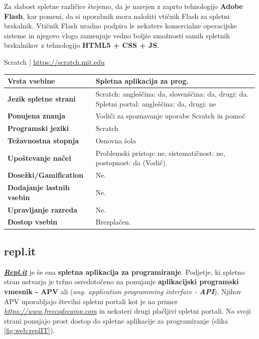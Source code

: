 Za slabost spletne različice štejemo, da je narejen z zaprto
tehnologijo \textbf{Adobe Flash}, kar pomeni, da si uporabnik mora
naložiti vtičnik Flash za spletni brskalnik. Vtičnik Flash uradno
podpira le nekatere komercialne operacijske sisteme in njegovo vlogo
zamenjuje vedno boljše zmožnosti samih spletnih brskalnikov z
tehnologijo \textbf{HTML5 + CSS + JS}.

\begin{osebnabox}[label={osebna:scratch}]{Scratch | \url{https://scratch.mit.edu}}
    \begin{tabular}{
  p{} |
  p{}  }
  \textbf{Vrsta vsebine} & Spletna aplikacija za prog. \\
      \hline
  \textbf{Jezik spletne strani} & Scratch: angleščina: da, slovenščina: da,
                                  drugi: da. Spletni portal:
                                  angleščina: da, drugi: ne\\
      \hline
  \textbf{Ponujena znanja} & Vodiči za spoznavanje uporabe Scratch in pomoč \\
      \hline
 \textbf{Programski jeziki} & Scratch \\
      \hline
  \textbf{Težavnostna stopnja} & Osnovna šola \\
      \hline
   \textbf{Upoštevanje načel} & Problemski pristop: ne,
                                sistematičnost: ne, postopnost: da (Vodič). \\
      \hline
  \textbf{Dosežki/Gamification} & Ne. \\
      \hline
  \textbf{Dodajanje lastnih vsebin} & Ne. \\
      \hline
  \textbf{Upravljanje razreda} & Ne. \\
      \hline
  \textbf{Dostop vsebin} & Brezplačen. \\

\end{tabular}
\end{osebnabox}

\subsection{repl.it}
\label{sec:repl.it}

\textbf{\emph{\href{https://repl.it/}{Repl.it}}} \cite{web:replIT} je še ena
\textbf{spletna aplikacija za programiranje}. Podjetje, ki spletno
stran ustvarja je tržno osredotočeno na ponujanje \textbf{aplikacijski
  programski vmesnik - APV} ali (\emph{ang. application programming
  interface - \textbf{API}}). Njihov APV uporabljajo številni spletni
portali kot je na primer
\emph{\href{freecodecamp}{https://www.freecodecamp.com}}
\cite{web:freecodecamp} in nekateri drugi plačljivi spletni
portali. Na svoji strani ponujajo prost dostop do spletne aplikacije
za programiranje (slika \ref{fig:web:replIT}).

